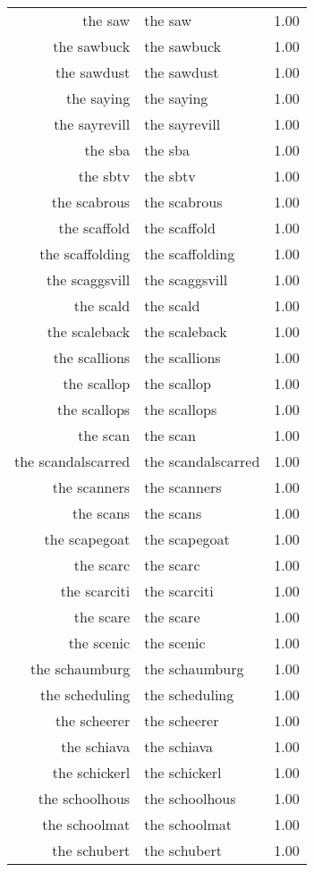 \begin{table}[ht]
\begin{tabular}{rlr}
  the saw & the saw & 1.00 \\ 
  the sawbuck & the sawbuck & 1.00 \\ 
  the sawdust & the sawdust & 1.00 \\ 
  the saying & the saying & 1.00 \\ 
  the sayrevill & the sayrevill & 1.00 \\ 
  the sba & the sba & 1.00 \\ 
  the sbtv & the sbtv & 1.00 \\ 
  the scabrous & the scabrous & 1.00 \\ 
  the scaffold & the scaffold & 1.00 \\ 
  the scaffolding & the scaffolding & 1.00 \\ 
  the scaggsvill & the scaggsvill & 1.00 \\ 
  the scald & the scald & 1.00 \\ 
  the scaleback & the scaleback & 1.00 \\ 
  the scallions & the scallions & 1.00 \\ 
  the scallop & the scallop & 1.00 \\ 
  the scallops & the scallops & 1.00 \\ 
  the scan & the scan & 1.00 \\ 
  the scandalscarred & the scandalscarred & 1.00 \\ 
  the scanners & the scanners & 1.00 \\ 
  the scans & the scans & 1.00 \\ 
  the scapegoat & the scapegoat & 1.00 \\ 
  the scarc & the scarc & 1.00 \\ 
  the scarciti & the scarciti & 1.00 \\ 
  the scare & the scare & 1.00 \\ 
  the scenic & the scenic & 1.00 \\ 
  the schaumburg & the schaumburg & 1.00 \\ 
  the scheduling & the scheduling & 1.00 \\ 
  the scheerer & the scheerer & 1.00 \\ 
  the schiava & the schiava & 1.00 \\ 
  the schickerl & the schickerl & 1.00 \\ 
  the schoolhous & the schoolhous & 1.00 \\ 
  the schoolmat & the schoolmat & 1.00 \\ 
  the schubert & the schubert & 1.00 \\ 

\end{tabular}
\end{table}
